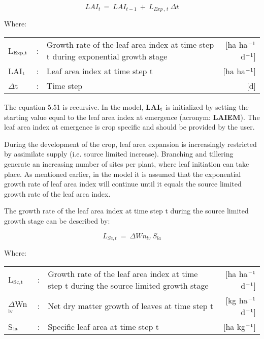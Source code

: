 \begin{equation}
\label{eq:5.51}
LAI _{t~} =~LAI _{t-1} ~+~L _{Exp\, ,\, t} ~\Delta t
\end{equation}

Where:\\[5pt]
\begin{tabularx}{\textwidth}{llXr}
L$_{{\rm Exp,t}}$ &:& Growth rate of the leaf area index at time step t
    during exponential growth stage    &    [ha ha$^{{\rm -1}}$ d$^{{\rm -1}}$]\\
LAI$_{{\rm t}}$ &:& Leaf area index at time step t   &
    [ha ha$^{{\rm -1}}$]\\
$\Delta$t &:& Time step   &    [d]
\end{tabularx}

The equation 5.51 is recursive. In the model, {\bf LAI$_{{\rm t}}$} is initialized by setting the starting
value equal to the leaf area index at emergence (acronym: {\bf LAIEM}). The leaf area index
at emergence is crop specific and should be provided by the user.

During the development of the crop, leaf area expansion is increasingly restricted by
assimilate supply (i.e. source limited increase). Branching and tillering generate an
increasing number of sites per plant, where leaf initiation can take place. As mentioned
earlier, in the model it is assumed that the exponential growth rate of leaf area index will
continue until it equals the source limited growth rate of the leaf area index.

The growth rate of the leaf area index at time step t during the source limited growth 
stage can be described by:

\begin{equation}
\label{eq:5.52}
L _{Sc,t} ~=~\Delta Wn _{lv} ~S _{la} 
\end{equation}

Where:\\[5pt]
\begin{tabularx}{\textwidth}{llXr}
L$_{{\rm Sc,t}}$ &:& Growth rate of the leaf area index at time step t
    during the source limited growth stage    &
    [ha ha$^{{\rm -1}}$ d$^{{\rm -1}}$]\\
$\Delta$Wn$_{{\rm lv}}$ &:& Net dry matter growth of leaves at time step t    &
    [kg ha$^{{\rm -1}}$ d$^{{\rm -1}}$]\\
S$_{{\rm la}}$ &:& Specific leaf area at time step t   &
    [ha kg$^{{\rm -1}}$]\\
\end{tabularx}
 
